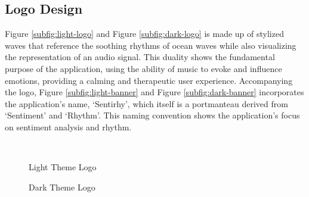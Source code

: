 \subsection{Logo Design}
Figure \ref{subfig:light-logo} and Figure \ref{subfig:dark-logo} is made up of stylized waves that reference the soothing rhythms of ocean waves while also visualizing the representation of an audio signal.
This duality shows the fundamental purpose of the application, using the ability of music to evoke and influence emotions, providing a calming and therapeutic user experience.
\indent Accompanying the logo, Figure \ref{subfig:light-banner} and Figure \ref{subfig:dark-banner} incorporates the application's name, `Sentirhy', which itself is a portmanteau derived from `Sentiment' and `Rhythm'.
This naming convention shows the application's focus on sentiment analysis and rhythm.
\begin{figure}[H]
    \centering
    \qquad
    \vspace{0.5cm}
    \\
    \caption{Light Theme Logo}
\end{figure}
\begin{figure}[H]
    \centering
    \caption{Dark Theme Logo}
\end{figure}

